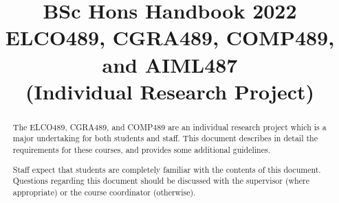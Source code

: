 \documentclass[11pt
              , a4paper
              , oneside
              ]{report}
\title{{\Huge BSc Hons Handbook
2022}\vspace{1cm}\\ ELCO489, CGRA489, COMP489, and AIML487 \\

(Individual Research Project)}
\date{}
\begin{document}
\frontmatter



 \begin{abstract}

   The ELCO489, CGRA489, and COMP489 are an individual research
   project which is a major undertaking for both students and staff.  This document
   describes in detail the requirements for these courses, and provides some
   additional guidelines.

   Staff expect that students are completely familiar with the contents
   of this document.  Questions regarding this document should be
   discussed with the supervisor (where appropriate) or the course
   coordinator (otherwise).

 \end{abstract}


\maketitle

\tableofcontents


\mainmatter








%





%
%
%
\end{document}
